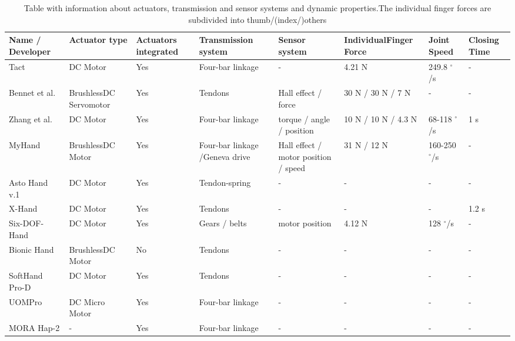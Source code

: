 \documentclass[a4paper, 10pt, conference]{ieeeconf}      %
\begin{document}
\vspace{10cm}

\begin{table}[h]

\begin{tabular}{p{2.4cm}|p{2cm}|p{1.2cm}|p{2.1cm}|p{2cm}|p{1.5cm}|p{1.5cm}|p{1.2cm}}

Name / \newline Developer & Actuator type & Actuators integrated & Transmission system & Sensor system & Individual\newline Finger Force & Joint Speed & Closing Time\\
\hline
Tact & DC Motor & Yes & Four-bar linkage & - & 4.21 N & 249.8 $^\circ$/s & -\\
\hline
Bennet et al. & Brushless\newline DC Servomotor & Yes & Tendons & Hall effect / force & 30 N / 30 N / 7 N & - & -\\
\hline
Zhang et al. & DC Motor & Yes & Four-bar linkage & torque / angle / position & 10 N / 10 N / 4.3 N & 68-118 $^\circ$/s & 1 s\\
\hline
MyHand & Brushless\newline DC Motor & Yes & Four-bar linkage /\newline Geneva drive & Hall effect / motor position / speed & 31 N / 12 N & 160-250 $^\circ$/s & -\\
\hline
Asto Hand v.1 & DC Motor & Yes & Tendon-spring & - & - & - & -\\
\hline
X-Hand & DC Motor & Yes & Tendons & - & - & - & 1.2 s\\
\hline
Six-DOF-Hand & DC Motor & Yes & Gears / belts & motor position & 4.12 N & 128 $^\circ$/s & -\\
\hline
Bionic Hand & Brushless\newline DC Motor & No & Tendons & - & - & - & -\\
\hline
SoftHand Pro-D & DC Motor & Yes & Tendons & - & - & - & -\\
\hline
UOMPro & DC Micro Motor & Yes & Four-bar linkage & - & - & - & -\\
\hline
MORA Hap-2 & - & Yes & Four-bar linkage & - & - & - & -\\
 

\end{tabular}

\caption{Table with information about actuators, transmission and sensor systems and dynamic properties.\newline The individual finger forces are subdivided into thumb/(index/)others}
\label{table:table2}

\end{table}
\end{document}

